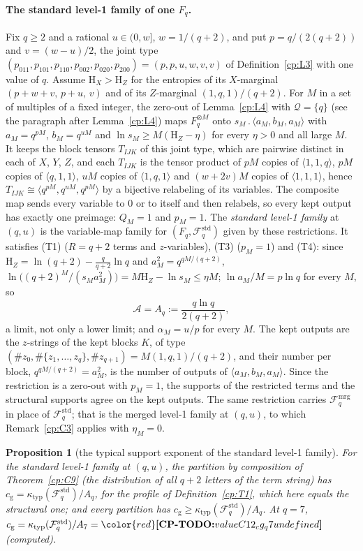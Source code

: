 \documentclass[11pt]{article}
\makeatletter
\newtheorem{proposition}[theorem]{Proposition}
\theoremstyle{definition}
\theoremstyle{remark}
\DeclareRobustCommand{\CPTODO}[1]{{\color{red}\textbf{[CP-TODO:} #1\textbf{]}}}
\newcommand{\Ent}{\mathrm{H}}                 %
\newcommand{\mat}[3]{\langle #1,#2,#3\rangle} %
\newcommand{\cp}{\mathbin{.}}                 %
\newcommand{\cg}{c_{\mathrm g}}               %
\newcommand{\Tcond}[1]{\textup{(T#1)}}        %
\newcommand{\Qs}{\mathcal{Q}}                 %
\newcommand{\Fstd}{\mathcal{F}^{\mathrm{std}}_q} %
\newcommand{\Fmrg}{\mathcal{F}^{\mathrm{mrg}}_q} %
\newcommand{\Acs}{\mathcal A}                %
\newcommand{\ktyp}{\kappa_{\mathrm{typ}}}    %
\newcommand{\cpv}[1]{\ifcsname cpv@#1\endcsname\csname cpv@#1\endcsname\else\CPTODO{value #1 undefined}\fi}
\makeatother
\begin{document}
\paragraph{The standard level-1 family of one $F_q$.}\label{cp:C12:fam}
Fix $q\ge2$ and a rational $u\in(0,w]$, $w=1/(q+2)$, and put $p=q/(2(q+2))$ and $v=(w-u)/2$, the joint type $(p_{011},p_{101},p_{110},p_{002},p_{020},p_{200})=(p,p,u,w,v,v)$ of Definition~\ref{cp:L3} with one value of $q$. Assume $\Ent_X>\Ent_Z$ for the entropies of its $X$-marginal $(p+w+v,\,p+u,\,v)$ and of its $Z$-marginal $(1,q,1)/(q+2)$. For $M$ in a set of multiples of a fixed integer, the zero-out of Lemma~\ref{cp:L4} with $\Qs=\{q\}$ (see the paragraph after Lemma~\ref{cp:L4}) maps $F_q^{\otimes M}$ onto $s_M\cp\mat{a_M}{b_M}{a_M}$ with $a_M=q^{pM}$, $b_M=q^{uM}$ and $\ln s_M\ge M(\Ent_Z-\eta)$ for every $\eta>0$ and all large $M$. It keeps the block tensors $T_{IJK}$ of this joint type, which are pairwise distinct in each of $X$, $Y$, $Z$, and each $T_{IJK}$ is the tensor product of $pM$ copies of $\mat11q$, $pM$ copies of $\mat q11$, $uM$ copies of $\mat1q1$ and $(w+2v)M$ copies of $\mat111$, hence $T_{IJK}\cong\mat{q^{pM}}{q^{uM}}{q^{pM}}$ by a bijective relabeling of its variables. The composite map sends every variable to $0$ or to itself and then relabels, so every kept output has exactly one preimage: $Q_M=1$ and $p_M=1$. The \emph{standard level-1 family} at $(q,u)$ is the variable-map family for $(F_q,\Fstd)$ given by these restrictions. It satisfies \Tcond1{} ($R=q+2$ terms and $z$-variables), \Tcond3{} ($p_M=1$) and \Tcond4: since $\Ent_Z=\ln(q+2)-\frac q{q+2}\ln q$ and $a_M^2=q^{qM/(q+2)}$, $\ln\bigl((q+2)^M/(s_Ma_M^2)\bigr)=M\Ent_Z-\ln s_M\le\eta M$; $\ln a_M/M=p\ln q$ for every $M$, so
\[
\Acs=A_q:=\frac{q\ln q}{2(q+2)},
\]
a limit, not only a lower limit; and $\alpha_M=u/p$ for every $M$. The kept outputs are the $z$-strings of the kept blocks $K$, of type $(\#z_0,\#\{z_1,\dots,z_q\},\#z_{q+1})=M(1,q,1)/(q+2)$, and their number per block, $q^{qM/(q+2)}=a_M^2$, is the number of outputs of $\mat{a_M}{b_M}{a_M}$. Since the restriction is a zero-out with $p_M=1$, the supports of the restricted terms and the structural supports agree on the kept outputs. The same restriction carries $\Fmrg$ in place of $\Fstd$; that is the merged level-1 family at $(q,u)$, to which Remark~\ref{cp:C3} applies with $\eta_M=0$.

\begin{proposition}[the typical support exponent of the standard level-1 family]\label{cp:C12}
For the standard level-1 family at $(q,u)$, the partition by composition of Theorem~\ref{cp:C9} (the distribution of all $q+2$ letters of the term string) has $\cg=\ktyp(\Fstd)/A_q$, for the profile of Definition~\ref{cp:T1}, which here equals the structural one; and every partition has $\cg\ge\ktyp(\Fstd)/A_q$. At $q=7$, $\cg=\ktyp(\Fstd)/A_7=\cpv{C12_cg_q7}$ (computed).
\end{proposition}
\end{document}
